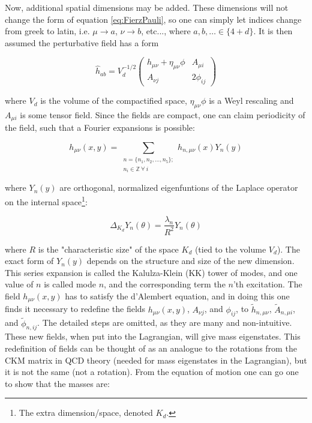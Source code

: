 \documentclass[11pt,a4paper]{article}
\begin{document}
Now, additional spatial dimensions may be added. These dimensions will not change the form of equation \ref{eq:FierzPauli}, so one can simply let indices change from greek to latin, i.e. $\mu\rightarrow a$, $\nu\rightarrow b$, etc..., where $a,b,\ldots \in \{4+d\}$. It is then assumed the perturbative field has a form

\begin{equation}
	\hat{h}_{ab} = 
	V_d^{-1/2}\begin{pmatrix}
	h_{\mu\nu} + \eta_{\mu\nu}\phi & A_{\mu i}\\
	A_{\nu j} & 2\phi_{ij}
	\end{pmatrix}
\end{equation}

where $V_d$ is the volume of the compactified space, $\eta_{\mu\nu}\phi$ is a Weyl rescaling and $A_{\mu i}$ is some tensor field. Since the fields are compact, one can claim periodicity of the field, such that a Fourier expansions is possible:

\begin{equation}
	h_{\mu\nu}(x,y) = \sum_{\substack{n=\{n_1,n_2,\ldots,n_5\}; \\ n_i\in\mathbb{Z}\:\forall\:i}} h_{n,\mu\nu}(x)Y_n(y)
\end{equation}

where $Y_n(y)$ are orthogonal, normalized eigenfuntions of the Laplace operator on the internal space\footnote{The extra dimension/space, denoted $K_d$.}:

\begin{equation}
\Delta_{K_d}Y_n(\theta) = \frac{\lambda_n}{R^2}Y_n(\theta)
\end{equation}

where $R$ is the "characteristic size" of the space $K_d$ (tied to the volume $V_d$). The exact form of $Y_n(y)$ depends on the structure and size of the new dimension. This series expansion is called the Kalulza-Klein (KK) tower of modes, and one value of $n$ is called mode $n$, and the corresponding term the $n$'th excitation. The field $h_{\mu\nu}(x,y)$ has to satisfy the d'Alembert equation, and in doing this one finds it necessary to redefine the fields $h_{\mu\nu}(x,y)$, $A_{\nu j}$, and $\phi_{ij}$, to $\tilde{h}_{n,\mu\nu}$, $\tilde{A}_{n,\mu i}$, and $\tilde{\phi}_{n,ij}$. The detailed steps are omitted, as they are many and non-intuitive. These new fields, when put into the Lagrangian, will give mass eigenstates. This redefinition of fields can be thought of as an analogue to the rotations from the CKM matrix in QCD theory (needed for mass eigenstates in the Lagrangian), but it is not the same (not a rotation). From the equation of motion one can go one to show that the masses are:
\end{document}
